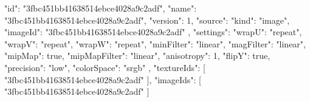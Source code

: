 {
  "id": "3fbc451bb41638514ebce4028a9c2adf",
  "name": "3fbc451bb41638514ebce4028a9c2adf",
  "version": 1,
  "source": {
    "kind": "image",
    "imageId": "3fbc451bb41638514ebce4028a9c2adf"
  },
  "settings": {
    "wrapU": "repeat",
    "wrapV": "repeat",
    "wrapW": "repeat",
    "minFilter": "linear",
    "magFilter": "linear",
    "mipMap": true,
    "mipMapFilter": "linear",
    "anisotropy": 1,
    "flipY": true,
    "precision": "low",
    "colorSpace": "srgb"
  },
  "textureIds": [
    "3fbc451bb41638514ebce4028a9c2adf"
  ],
  "imageIds": [
    "3fbc451bb41638514ebce4028a9c2adf"
  ]
}
